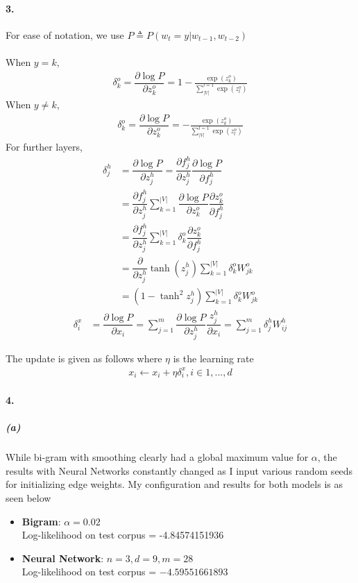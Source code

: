 \documentclass[10pt,letter]{article}
\begin{document}
\paragraph*{3.}

For ease of notation, we use $P\triangleq P(w_t=y|w_{t-1}, w_{t-2})$ 
\\
\\
When $y=k$,
\begin{align*}
\delta^o_k=\dfrac{\partial \log P}{\partial z^o_k}=1-\frac{\exp{(z^o_k)}}{\sum_{|V|}^{l=1}\exp{(z^o_l)}}
\end{align*}
When $y\neq k$,
\begin{align*}
\delta^o_k=\dfrac{\partial \log P}{\partial z^o_k}=-\frac{\exp{(z^o_k)}}{\sum_{|V|}^{l=1}\exp{(z^o_l)}}
\end{align*}
For further layers, 
\begin{align*}
\delta^h_j &= \dfrac{\partial \log P}{\partial z^h_j} = \dfrac{\partial f^h_j}{\partial z^h_j} \dfrac{\partial \log P}{\partial f^h_j} \\
&= \dfrac{\partial f^h_j}{\partial z^h_j} \sum_{k=1}^{|V|}\dfrac{\partial \log P}{\partial z^o_k}\dfrac{\partial z^o_k}{\partial f^h_j} \\
&= \dfrac{\partial f^h_j}{\partial z^h_j} \sum_{k=1}^{|V|}\delta^o_k\dfrac{\partial z^o_k}{\partial f^h_j} \\
&= \dfrac{\partial}{\partial z^h_j}\tanh{(z^h_j)} \sum_{k=1}^{|V|}\delta^o_k W^o_{jk} \\
&= (1-\tanh^2z^h_j)\sum_{k=1}^{|V|}\delta^o_k W^o_{jk}
\end{align*}
\begin{align*}
\delta^x_i &= \dfrac{\partial \log P}{\partial x_i} = \sum_{j=1}^{m}\dfrac{\partial \log P}{\partial z^h_j}\dfrac{z^h_j}{\partial x_i} = \sum_{j=1}^{m} \delta^h_j W^h_{ij}
\end{align*}

The update is given as follows where $\eta$ is the learning rate
\begin{align*}
x_i \leftarrow x_i + \eta \delta^x_i, i\in{1,...,d}
\end{align*}

\paragraph*{4.}

\subparagraph*{(a)}

While bi-gram with smoothing clearly had a global maximum value for $\alpha$, the results with Neural Networks constantly changed as I input various random seeds for initializing edge weights. My configuration and results for both models is as seen below
	\begin{itemize}
		\item \textbf{Bigram}: $\alpha = 0.02$ \\
		Log-likelihood on test corpus = -4.84574151936
		\item \textbf{Neural Network}: $n=3, d=9, m=28$\\
		Log-likelihood on test corpus = $-4.59551661893$
	\end{itemize}
\end{document}
